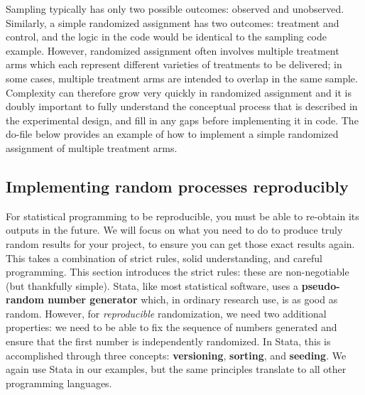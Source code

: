 
Sampling typically has only two possible outcomes: observed and unobserved.
Similarly, a simple randomized assignment has two outcomes: treatment and control,
and the logic in the code would be identical to the sampling code example.
However, randomized assignment often involves multiple treatment arms
which each represent different varieties of treatments to be delivered;
in some cases, multiple treatment arms are intended to overlap in the same sample.
Complexity can therefore grow very quickly in randomized assignment
and it is doubly important to fully understand the conceptual process
that is described in the experimental design,
and fill in any gaps before implementing it in code.
The do-file below provides an example of how to implement
a simple randomized assignment of multiple treatment arms.



\subsection{Implementing random processes reproducibly}

For statistical programming to be reproducible,
you must be able to re-obtain its outputs in the future.\cite{orozco2018make}
We will focus on what you need to do to produce
truly random results for your project,
to ensure you can get those exact results again.
This takes a combination of strict rules, solid understanding, and careful programming.
This section introduces the strict rules:
these are non-negotiable (but thankfully simple).
Stata, like most statistical software, uses a \textbf{pseudo-random number generator}
which, in ordinary research use, is as good as random.
However, for \textit{reproducible} randomization, we need two additional properties:
we need to be able to fix the sequence of numbers generated and
ensure that the first number is independently randomized.
In Stata, this is accomplished through three concepts:
\textbf{versioning}, \textbf{sorting}, and \textbf{seeding}.
We again use Stata in our examples,
but the same principles translate to all other programming languages.

